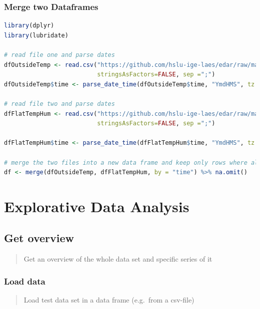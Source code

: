 \documentclass[
]{book}
\begin{document}
\hypertarget{DATAWRANGLING-MERGE-TWO-DATAFRAMES}{%
\subsection{Merge two Dataframes}\label{DATAWRANGLING-MERGE-TWO-DATAFRAMES}}

\begin{lstlisting}[language=R]
library(dplyr)
library(lubridate)

# read file one and parse dates
dfOutsideTemp <- read.csv("https://github.com/hslu-ige-laes/edar/raw/master/sampleData/centralOutsideTemp.csv",
                          stringsAsFactors=FALSE, sep =";")
dfOutsideTemp$time <- parse_date_time(dfOutsideTemp$time, "YmdHMS", tz = "Europe/Zurich")

# read file two and parse dates
dfFlatTempHum <- read.csv("https://github.com/hslu-ige-laes/edar/raw/master/sampleData/flatTempHum.csv",
                          stringsAsFactors=FALSE, sep =";")

dfFlatTempHum$time <- parse_date_time(dfFlatTempHum$time, "YmdHMS", tz = "Europe/Zurich")

# merge the two files into a new data frame and keep only rows where all values are available
df <- merge(dfOutsideTemp, dfFlatTempHum, by = "time") %>% na.omit()
\end{lstlisting}

\hypertarget{explorative-data-analysis}{%
\chapter{Explorative Data Analysis}\label{explorative-data-analysis}}

\hypertarget{get-overview}{%
\section{Get overview}\label{get-overview}}

\begin{quote}
Get an overview of the whole data set and specific series of it
\end{quote}

\hypertarget{load-data}{%
\subsection{Load data}\label{load-data}}

\begin{quote}
Load test data set in a data frame (e.g.~from a csv-file)
\end{quote}
\end{document}
